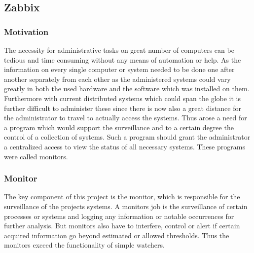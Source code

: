 \subsection{Zabbix}

\subsubsection{Motivation}
	The necessity for administrative tasks on great number of computers can be tedious and time consuming without any means of automation or help. As the information on every single computer or system needed to be done one after another separately from each other as the administered systems could vary greatly in both the used hardware and the software which was installed on them. Furthermore with current distributed systems which could span the globe it is further difficult to administer these since there is now also a great distance for the administrator to travel to actually access the systems. Thus arose a need for a program which would support the surveillance and to a certain degree the control of a collection of systems. Such a program should grant the administrator a centralized access to view the status of all necessary systems. These programs were called monitors.
\subsubsection{Monitor}
	The key component of this project is the monitor, which is responsible for the surveillance of the projects systems. A monitors job is the surveillance of certain processes or systems and logging any information or notable occurrences for further analysis. But monitors also have to interfere, control or alert if certain acquired information go beyond estimated or allowed thresholds. Thus the monitors exceed the functionality of simple watchers.\cite{zab1}
